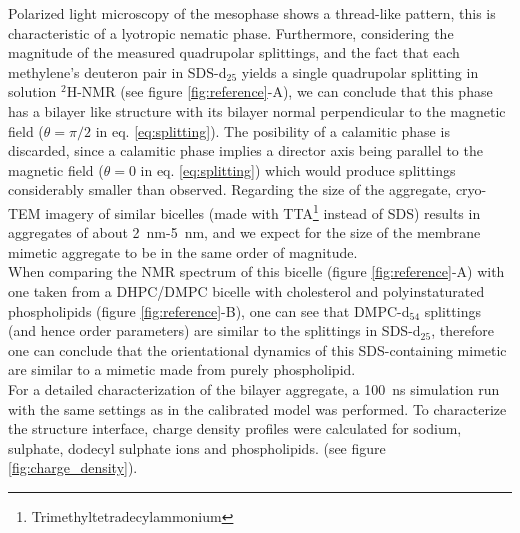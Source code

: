 \documentclass[3p,preprint,review]{elsarticle}
\begin{document}
	Polarized light microscopy of the mesophase shows a thread-like pattern, this
	is
	characteristic of a lyotropic nematic phase\cite{dierking2006textures}.
	Furthermore, considering the magnitude of the measured quadrupolar
	splittings, and the fact that each methylene's deuteron pair in SDS-d$_{25}$
	yields
	a
	single quadrupolar splitting in solution $^2$H-NMR (see figure
	\ref{fig:reference}-A), we can conclude that this phase has a bilayer
	like structure with its bilayer normal perpendicular
	to the magnetic field ($\theta=\pi/2$ in eq. \ref{eq:splitting}). The
	posibility of a calamitic phase is discarded, since a calamitic phase implies a
	director axis being parallel to the magnetic field ($\theta=0$ in eq.
	\ref{eq:splitting}) which would produce splittings considerably smaller than
	observed. Regarding the size of the aggregate, cryo-TEM imagery of similar
  bicelles (made with TTA\footnote{Trimethyltetradecylammonium} instead of SDS)
  results in aggregates of about
  \SI{2}{nm}-\SI{5}{nm}, and we expect for the size of
  the membrane mimetic aggregate to be in the same order of magnitude.\\
   When comparing the NMR spectrum of this bicelle (figure \ref{fig:reference}-A) with one taken from a DHPC/DMPC bicelle with cholesterol and polyinstaturated phospholipids (figure \ref{fig:reference}-B), one can see that DMPC-d$_{54}$ splittings (and hence order parameters) are similar to the splittings in SDS-d$_{25}$, therefore one can conclude that the orientational dynamics of this SDS-containing mimetic are similar to a mimetic made from purely phospholipid.\\ 
	
	For a detailed characterization of the bilayer aggregate, a \SI{100}{ns}
	simulation run with the same settings as in the calibrated model was performed.
	To characterize the structure
	interface, charge density profiles were calculated for sodium, sulphate,
	dodecyl sulphate ions and phospholipids. (see figure \ref{fig:charge_density}).
	
\end{document}
